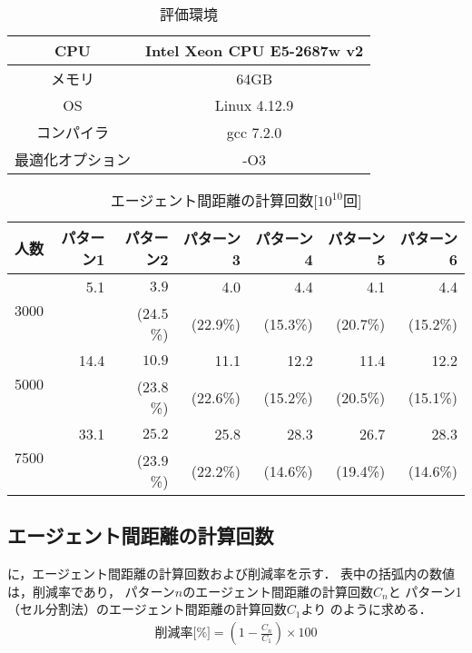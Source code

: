 \begin{table}[tb]
  \begin{center}
    \caption{評価環境}
    \label{tb:com_env}
    \begin{tabular}{c|c}
      \hline \hline
      CPU              & Intel Xeon CPU E5-2687w v2 \\ \hline
      メモリ           & 64GB                       \\ \hline
      OS               & Linux 4.12.9               \\ \hline
      コンパイラ       & gcc 7.2.0                  \\ \hline
      最適化オプション & -O3                        \\ \hline
    \end{tabular}
  \end{center}
\end{table}
\fi


\begin{table}[tb]
\begin{center}
\caption{エージェント間距離の計算回数[$10^{10}$回]}
\label{tb:count_result_yobi}
\begin{tabular}{c|r|r|r|r|r|r}
\hline \hline
	人数 & パターン1 & パターン2 & パターン3 & パターン4 & パターン5 & パターン6 \\  
	\hline
	\multirow{2}{*}{3000} 
	& 5.1   & $\mathbf{3.9}$   & 4.0    & 4.4    & 4.1    & 4.4   \\  
	&       & ($\mathbf{24.5}$\%) 					& (22.9\%) & (15.3\%) & (20.7\%) & (15.2\%) \\ \hline
	\multirow{2}{*}{5000} 
	& 14.4  &  $\mathbf{10.9}$  					  & 11.1   & 12.2   & 11.4   & 12.2  \\  
	&       & ($\mathbf{23.8}$\%) 					& (22.6\%) & (15.2\%) & (20.5\%) & (15.1\%) \\ \hline
	\multirow{2}{*}{7500} 
	& 33.1  & $\mathbf{25.2}$	 		    	 	 & 25.8   & 28.3   & 26.7   & 28.3  \\ 
	&       & ($\mathbf{23.9}$\%) 					& (22.2\%) & (14.6\%) & (19.4\%) & (14.6\%) \\ \hline
    \end{tabular}
  \end{center}
\end{table}


\subsection{エージェント間距離の計算回数}
\label{sec:count}
に，エージェント間距離の計算回数および削減率を示す．
表中の括弧内の数値は，削減率であり，
パターン$n$のエージェント間距離の計算回数$C_{n}$と
パターン1（セル分割法）のエージェント間距離の計算回数$C_{1}$より
のように求める．
%
\begin{align}
	\mbox{削減率[\%]} = ( 1 - \frac{C_{n}}{C_{1}}) \times 100
    \label{eq:sakugen}
\end{align}

